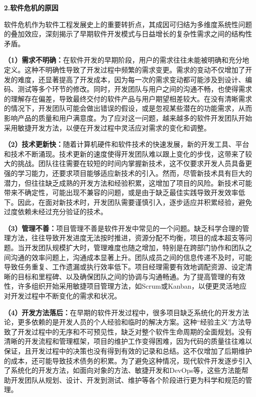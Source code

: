 \documentclass[12pt,a4paper]{article}
\begin{document}
\textbf{2.软件危机的原因}

软件危机作为软件工程发展史上的重要转折点，其成因可归结为多维度系统性问题的叠加效应，深刻揭示了早期软件开发模式与日益增长的复杂性需求之间的结构性矛盾。

\textbf{（1）需求不明确：}在软件开发的早期阶段，用户的需求往往未能被明确和充分地定义。这种不明确性导致了开发过程中频繁的需求变更。需求的变动不仅增加了开发的难度，还显著提高了开发成本，因为每一次的需求变动都可能涉及到设计、编码、测试等多个环节的修改。同时，开发团队与用户之间的沟通不畅，也使得需求的理解存在偏差，导致最终交付的软件产品与用户期望相差较大。在没有清晰需求的情况下，开发团队可能会做出错误的假设，或是忽视某些潜在的功能需求，从而影响产品的质量和用户满意度。为了应对这一问题，越来越多的软件开发团队开始采用敏捷开发方法，以便在开发过程中灵活应对需求的变化和调整。

\textbf{（2）技术更新快：}随着计算机硬件和软件技术的快速发展，新的开发工具、平台和技术不断涌现。技术更新的速度使得开发团队难以跟上变化的步伐，这带来了较大的挑战。团队往往需要在较短的时间内掌握新技术，这不仅要求开发人员具备更强的学习能力，还要求项目能够适应新技术的引入。然而，尽管新技术具有巨大的潜力，但往往缺乏成熟的开发方法和经验积累，这增加了项目的风险。新技术可能带来不确定性，可能出现不兼容的问题，或是由于缺乏最佳实践导致开发效率低下。因此，在面对新技术时，开发团队需要谨慎引入，逐步适应并积累经验，避免过度依赖未经过充分验证的技术。

\textbf{（3）管理不善：}项目管理不善是软件开发中常见的一个问题。缺乏科学合理的管理方法，往往导致开发进度无法按时推进，资源分配不均衡，项目的成本超支等问题。当开发团队规模扩大时，管理难度也随之增加，特别是在跨部门协作和团队之间沟通的效率问题上，沟通成本显著上升。团队成员之间的信息传递不及时，可能导致任务重复、工作遗漏或执行效率低下。项目经理需要有效地调配资源、设定清晰的目标和里程碑、以及确保团队之间的协调与沟通畅通。为了提高管理的有效性，许多组织开始采用敏捷项目管理方法，如Scrum或Kanban，以便更灵活地应对开发过程中不断变化的需求和状况。

\textbf{（4）开发方法落后：}在早期的软件开发过程中，很多项目缺乏系统化的开发方法论，更多依赖的是开发人员的个人经验和临时的解决方案。这种``经验主义''方法导致了开发过程中的无序和不可预见性，缺乏对整个软件生命周期的全面规划。没有清晰的开发流程和管理框架，项目的维护工作变得困难，因为代码的质量往往难以保证，且开发过程中的决策也没有得到有效的记录和总结。这不仅增加了后期维护的成本，还可能导致技术债务的积累。为了避免这种情况，现代软件开发逐步引入了系统化的开发方法，如面向对象的方法、敏捷开发和DevOps等，这些方法能帮助开发团队从规划、设计、开发到测试、维护等各个阶段进行更为科学和规范的管理。
\end{document}
